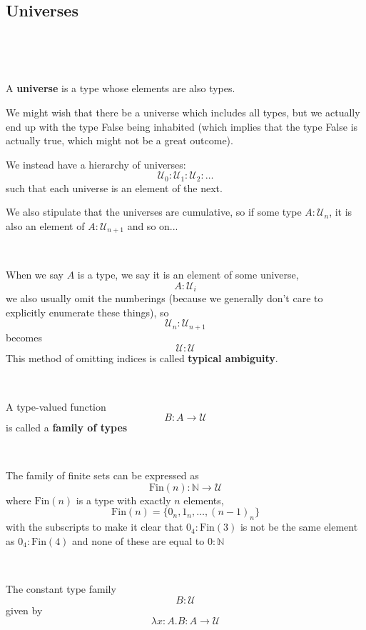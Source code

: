 \documentclass{article}
\begin{document}
\subsection{Universes}
\

\begin{definition}[Universes]
\

A \textbf{universe} is a type whose elements are also types. 

We might wish that there be a universe which includes all types, but we actually end up with the type False being inhabited (which implies that the type False is actually true, which might not be a great outcome).

We instead have a hierarchy of universes: $$\mathcal{U}_0: \mathcal{U}_1 : \mathcal{U}_2 : \dots$$such that each universe is an element of the next. 

We also stipulate that the universes are cumulative, so if some type $A: \mathcal{U}_n$, it is also an element of $A: \mathcal{U}_{n+1}$ and so on...
\end{definition}

\begin{remark}
\

When we say $A$ is a type, we say it is an element of some universe, $$A : \mathcal{U}_i$$we also usually omit the numberings (because we generally don't care to explicitly enumerate these things), so $$\mathcal{U}_n : \mathcal{U}_{n+1}$$becomes $$\mathcal{U}: \mathcal{U}$$This method of omitting indices is called \textbf{typical ambiguity}. 
\end{remark}

\begin{definition}
\

A type-valued function $$B: A \to \mathcal{U}$$is called a \textbf{family of types}
\end{definition}

\begin{example}
\

The family of finite sets can be expressed as $$\text{Fin}(n): \mathbb{N} \to \mathcal{U}$$where $\text{Fin}(n)$ is a type with exactly $n$ elements, $$\text{Fin}(n) = \{0_n, 1_n, \dots, (n-1)_n\}$$with the subscripts to make it clear that $0_4 : \text{Fin}(3)$ is not be the same element as $0_4 : \text{Fin}(4)$ and none of these are equal to $0 : \mathbb{N}$
\end{example}

\begin{example}
\

The constant type family $$B: \mathcal{U}$$given by $$\lambda x:A.B : A \to \mathcal{U}$$
\end{example}
\end{document}
